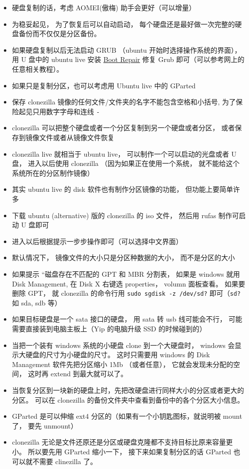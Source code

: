 
\begin{issues}
\issueDraft
\end{issues}

\begin{itemize}
\item 硬盘复制的话，考虑 AOMEI(傲梅) 助手会更好（可以增量）
\item 为稳妥起见， 为了恢复后可以自动启动， 每个硬盘还是最好做一次完整的硬盘备份而不仅仅是分区备份。
\item 如果硬盘复制以后无法启动 GRUB （ubuntu 开始时选择操作系统的界面）， 用 U 盘中的 ubuntu live 安装 \href{https://help.ubuntu.com/community/Boot-Repair}{Boot Repair} 修复 Grub 即可（可以参考网上的任意相关教程）。
\item 如果只是复制分区，也可以考虑用 Ubuntu live 中的 GParted
\item 保存 clonezilla 镜像的任何文件/文件夹的名字不能包含空格和小括号, 为了保险起见只用数字字母和连线 \verb`-`
\item clonezilla 可以把整个硬盘或者一个分区复制到另一个硬盘或者分区， 或者保存到镜像文件或者从镜像文件恢复
\item clonezilla live 就相当于 ubuntu live， 可以制作一个可以启动的光盘或者 U 盘， 进入以后使用 clonezilla （因为如果正在使用一个系统， 就不能给这个系统所在的分区制作镜像）
\item 其实 ubuntu live 的 disk 软件也有制作分区镜像的功能， 但功能上要简单许多

\item 下载 ubuntu (alternative) 版的 clonezilla 的 iso 文件， 然后用 rufas 制作可启动 U 盘即可
\item 进入以后根据提示一步步操作即可（可以选择中文界面）
\item 默认情况下， 镜像文件的大小只是分区种数据的大小， 而不是分区的大小

\item 如果提示 “磁盘存在不匹配的 GPT 和 MBR 分割表， 如果是 windows 就用 Disk Management, 在 Disk X 右键选 properties， volumn 面板查看。 如果要删除 GPT， 就 clonezilla 的命令行用 \verb|sudo sgdisk -z /dev/sd?| 即可（\verb|sd?| 如 sda, sdb 等）
\item 如果目标硬盘是一个 sata 接口的硬盘， 用 sata 转 usb 线可能会不行， 可能需要直接装到电脑主板上（Yip 的电脑升级 SSD 的时候碰到的）
\item 当把一个装有 windows 系统的小硬盘 clone 到一个大硬盘时， windows 会显示大硬盘的尺寸为小硬盘的尺寸。 这时只需要用 windows 的 Disk Management 软件先把分区缩小 1Mb （或者任意）， 它就会发现未分配的空间， 这时再 extend 到最大就可以了。
\item 当恢复分区到一块新的硬盘上时，先把改硬盘进行同样大小的分区或者更大的分区。 可以在 clonezilla 的备份文件夹中查看到备份中的各个分区大小信息。
\end{itemize}

\begin{itemize}
\item GParted 是可以伸缩 ext4 分区的（如果有一个小钥匙图标，就说明被 mount 了， 要先 unmount）
\item clonezilla 无论是文件还原还是分区或硬盘克隆都不支持目标比原来容量更小。 所以要先用 GParted 缩小一下， 接下来如果复制分区的话 GParted 也可以就不需要 clinezilla 了。
\end{itemize}


